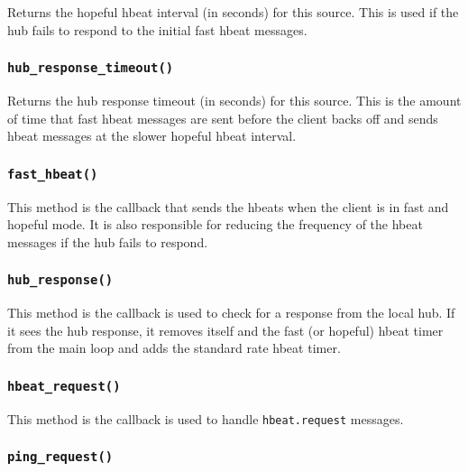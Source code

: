 \documentclass[12pt,a4paper]{article}
\begin{document}
Returns the hopeful hbeat interval (in seconds) for this source.
This is used if the hub fails to respond to the initial fast hbeat
messages.

\subsubsection*{\texttt{hub\_response\_timeout()}\label{xPL::Client_hub_response_timeout_}}


Returns the hub response timeout (in seconds) for this source.  This
is the amount of time that fast hbeat messages are sent before the
client backs off and sends hbeat messages at the slower hopeful hbeat
interval.

\subsubsection*{\texttt{fast\_hbeat()}\label{xPL::Client_fast_hbeat_}}


This method is the callback that sends the hbeats when the
client is in fast and hopeful mode.  It is also responsible
for reducing the frequency of the hbeat messages if the
hub fails to respond.

\subsubsection*{\texttt{hub\_response()}\label{xPL::Client_hub_response_}}


This method is the callback is used to check for a response from the
local hub.  If it sees the hub response, it removes itself and the
fast (or hopeful) hbeat timer from the main loop and adds the
standard rate hbeat timer.

\subsubsection*{\texttt{hbeat\_request()}\label{xPL::Client_hbeat_request_}}


This method is the callback is used to handle \texttt{hbeat.request} messages.

\subsubsection*{\texttt{ping\_request()}\label{xPL::Client_ping_request_}}
\end{document}
